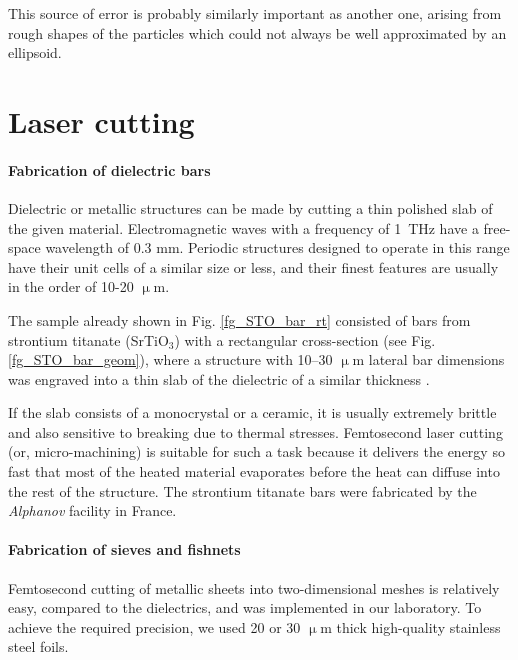 This source of error is probably similarly important as another one, arising from rough shapes of the particles which could not always be well approximated by an ellipsoid. 

\section{Laser cutting}
\paragraph{Fabrication of dielectric bars}%
Dielectric or metallic structures can be made by cutting a thin polished slab of the given material. Electromagnetic waves with a frequency of  1~THz have a free-space wavelength of 0.3 mm. Periodic structures designed to operate in this range have their unit cells of a similar size or less, and their finest features are usually in the order of 10-20 $\upmu$m. 

The sample already shown in Fig. \ref{fg_STO_bar_rt} consisted of bars from strontium titanate (SrTiO$_{3}$) with a rectangular cross-section (see Fig. \ref{fg_STO_bar_geom}), where a structure with 10--30 $\upmu$m lateral bar dimensions was engraved into a thin slab of the dielectric of a similar thickness \cite{yahiaoui2011tunable}.

If the slab consists of a monocrystal or a ceramic, it is usually extremely brittle and also sensitive to breaking due to thermal stresses. Femtosecond laser cutting (or, micro-machining) is suitable for such a task because it delivers the energy so fast that most of the heated material evaporates before the heat can diffuse into the rest of the structure. 
The strontium titanate bars were fabricated by the \textit{Alphanov} facility in France.

\paragraph{Fabrication of sieves and fishnets}%
Femtosecond cutting of metallic sheets into two-dimensional meshes is relatively easy,   
compared to the dielectrics, 
and was implemented in our laboratory. To achieve the required precision, we used 20 or 30 $\upmu$m thick high-quality stainless steel foils. 

